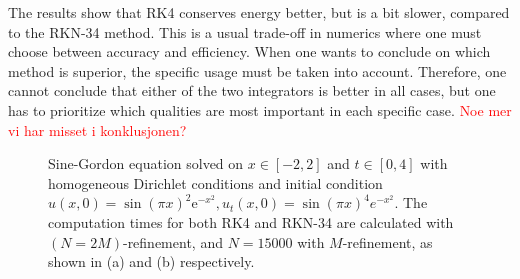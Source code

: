 The results show that RK4 conserves energy better, but is a bit slower, compared to the RKN-34 method. This is a usual trade-off in numerics where one must choose between accuracy and efficiency. When one wants to conclude on which method is superior, the specific usage must be taken into account. Therefore, one cannot conclude that either of the two integrators is better in all cases, but one has to prioritize which qualities are most important in each specific case. \textcolor{red}{Noe mer vi har misset i konklusjonen?}

\begin{figure}
  \centering
  \hspace{0mm}
  \hspace{0mm}
  \caption{Sine-Gordon equation solved on $x \in [-2,2]$ and $t \in [0,4]$ with homogeneous Dirichlet conditions and initial condition $u(x,0)=\sin(\pi x)^2 \mathrm{e}^{-x^2}, u_t(x,0) = \sin{(\pi x)^4e^{-x^2}}$. The computation times for both RK4 and RKN-34 are calculated with $(N=2M)$-refinement, and $N=15000$ with $M$-refinement, as shown in (a) and (b) respectively.}
  \label{fig:part2f_time}
\end{figure}



\newpage
\ 
\newpage